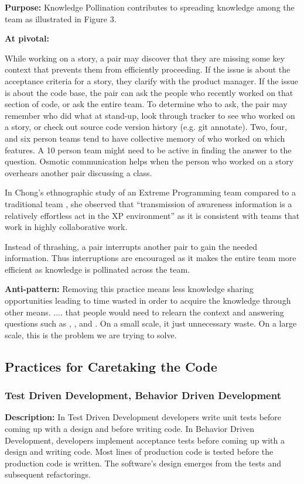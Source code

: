 \begin{table}[]
\textbf{Purpose:} Knowledge Pollination contributes to spreading knowledge among the team as illustrated in Figure 3.

\textbf{At pivotal:}

While working on a story, a pair may discover that they are missing some key context that prevents them from efficiently proceeding. If the issue is about the acceptance criteria for a story, they clarify with the product manager. If the issue is about the code base, the pair can ask the people who recently worked on that section of code, or ask the entire team.  To determine who to ask, the pair may remember who did what at stand-up, look through tracker to see who worked on a story, or check out source code version history (e.g. git annotate). Two, four, and six  person teams tend to have collective memory of who worked on which features. A 10 person team might need to be active in finding the answer to the question. Osmotic communication helps when the person who worked on a story overhears another pair discussing a class.

In Chong's ethnographic study of an Extreme Programming team compared to a traditional team \cite{ChongNominum}, she observed that ``transmission of awareness information is a relatively effortless act in the XP environment” as it is consistent with teams that work in highly collaborative work. 

Instead of thrashing, a pair interrupts another pair to gain the needed information. Thus interruptions are encouraged as it makes the entire team more efficient as knowledge is pollinated across the team. 

\textbf{Anti-pattern:} Removing this practice means less knowledge sharing opportunities leading to time wasted in order to acquire the knowledge through other means.
.... that people would need to relearn the context and answering questions such as , , and . On a small scale, it just unnecessary waste. On a large scale, this is the problem we are trying to solve.
\subsection{Practices for Caretaking the Code}
\subsubsection{Test Driven Development, Behavior Driven Development}
\textbf{Description:} In Test Driven Development developers write unit tests before coming up with a design and before writing code. In Behavior Driven Development, developers implement acceptance tests before coming up with a design and writing code.  Most lines of production code is tested before the production code is written. The software's design emerges from the tests and subsequent refactorings.


\end{table}

